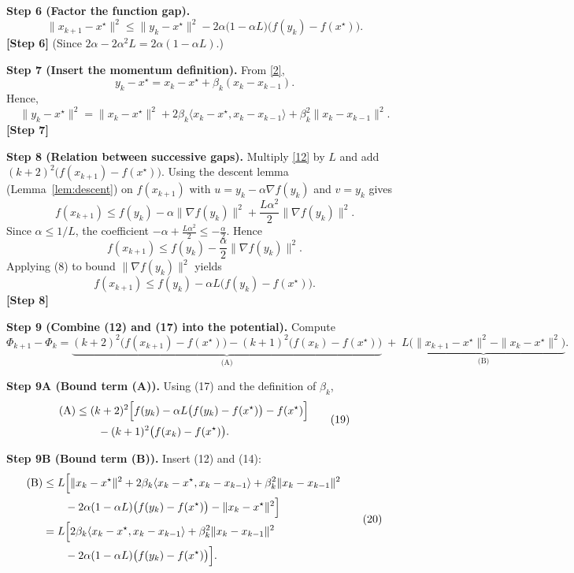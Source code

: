 \documentclass{article}
\newcommand{\grad}{\nabla}
\begin{document}
\noindent\textbf{Step 6 (Factor the function gap).}
\[
\|x_{k+1}-x^\star\|^2
\le \|y_k-x^\star\|^2
-2\alpha\bigl(1-\alpha L\bigr)\bigl(f(y_k)-f(x^\star)\bigr) .
\tag{12}
\]
\textbf{[Step 6]} (Since $2\alpha-2\alpha^2L=2\alpha(1-\alpha L)$.)

\noindent\textbf{Step 7 (Insert the momentum definition).} From \eqref{2},
\[
y_k - x^\star = x_k - x^\star + \beta_k (x_k-x_{k-1}) .
\tag{13}
\]
Hence,
\[
\|y_k-x^\star\|^2
= \|x_k-x^\star\|^2 + 2\beta_k\langle x_k-x^\star, x_k-x_{k-1}\rangle
+ \beta_k^2\|x_k-x_{k-1}\|^2 .
\tag{14}
\]
\textbf{[Step 7]}

\noindent\textbf{Step 8 (Relation between successive gaps).} Multiply \eqref{12} by $L$ and add $(k+2)^2\bigl(f(x_{k+1})-f(x^\star)\bigr)$. Using the descent lemma (Lemma~\ref{lem:descent}) on $f(x_{k+1})$ with $u=y_k-\alpha\grad f(y_k)$ and $v=y_k$ gives
\[
f(x_{k+1})\le f(y_k)-\alpha\|\grad f(y_k)\|^2 +\frac{L\alpha^2}{2}\|\grad f(y_k)\|^2 .
\tag{15}
\]
Since $\alpha\le 1/L$, the coefficient $-\alpha+\frac{L\alpha^2}{2}\le -\frac{\alpha}{2}$. Hence
\[
f(x_{k+1})\le f(y_k)-\frac{\alpha}{2}\|\grad f(y_k)\|^2 .
\tag{16}
\]
Applying (8) to bound $\|\grad f(y_k)\|^2$ yields
\[
f(x_{k+1})\le f(y_k)-\alpha L\bigl(f(y_k)-f(x^\star)\bigr) .
\tag{17}
\]
\textbf{[Step 8]}

\noindent\textbf{Step 9 (Combine (12) and (17) into the potential).} Compute
\[
\Phi_{k+1}-\Phi_k=
\underbrace{(k+2)^2\bigl(f(x_{k+1})-f(x^\star)\bigr)
-(k+1)^2\bigl(f(x_k)-f(x^\star)\bigr)}_{\text{(A)}}
\;+\;
\underbrace{L\bigl(\|x_{k+1}-x^\star\|^2-\|x_k-x^\star\|^2\bigr)}_{\text{(B)}} .
\tag{18}
\]

\noindent\textbf{Step 9A (Bound term (A)).} Using (17) and the definition of $\beta_k$,
\[
\begin{aligned}
\text{(A)} &\le (k+2)^2\Bigl[f(y_k)-\alpha L\bigl(f(y_k)-f(x^\star)\bigr)-f(x^\star)\Bigr] \\
&\qquad -(k+1)^2\bigl(f(x_k)-f(x^\star)\bigr) .
\end{aligned}
\tag{19}
\]

\noindent\textbf{Step 9B (Bound term (B)).} Insert (12) and (14):
\[
\begin{aligned}
\text{(B)} &\le L\Bigl[\|x_k-x^\star\|^2
+2\beta_k\langle x_k-x^\star,x_k-x_{k-1}\rangle
+\beta_k^2\|x_k-x_{k-1}\|^2 \\
&\qquad -2\alpha(1-\alpha L)\bigl(f(y_k)-f(x^\star)\bigr)
-\|x_k-x^\star\|^2\Bigr] \\
&= L\Bigl[2\beta_k\langle x_k-x^\star,x_k-x_{k-1}\rangle
+\beta_k^2\|x_k-x_{k-1}\|^2 \\
&\qquad -2\alpha(1-\alpha L)\bigl(f(y_k)-f(x^\star)\bigr)\Bigr] .
\end{aligned}
\tag{20}
\]
\end{document}
